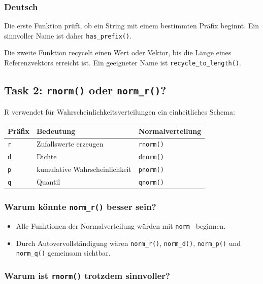 \documentclass[11pt,a4paper]{ctexart}
\begin{document}
\subsubsection*{Deutsch}

Die erste Funktion prüft, ob ein String mit einem bestimmten Präfix beginnt.
Ein sinnvoller Name ist daher \texttt{has\_prefix()}.

Die zweite Funktion recycelt einen Wert oder Vektor, bis die Länge eines
Referenzvektors erreicht ist. Ein geeigneter Name ist
\texttt{recycle\_to\_length()}.

\subsection{Task 2: \texttt{rnorm()} oder \texttt{norm\_r()}?}

R verwendet für Wahrscheinlichkeitsverteilungen ein einheitliches Schema:

\begin{center}
\begin{tabular}{lll}
\toprule
Präfix & Bedeutung & Normalverteilung \\
\midrule
\texttt{r} & Zufallswerte erzeugen & \texttt{rnorm()} \\
\texttt{d} & Dichte & \texttt{dnorm()} \\
\texttt{p} & kumulative Wahrscheinlichkeit & \texttt{pnorm()} \\
\texttt{q} & Quantil & \texttt{qnorm()} \\
\bottomrule
\end{tabular}
\end{center}

\subsubsection*{Warum könnte \texttt{norm\_r()} besser sein?}

\begin{itemize}
  \item Alle Funktionen der Normalverteilung würden mit \texttt{norm\_}
  beginnen.
  \item Durch Autovervollständigung wären
  \texttt{norm\_r()}, \texttt{norm\_d()}, \texttt{norm\_p()} und
  \texttt{norm\_q()} gemeinsam sichtbar.
\end{itemize}

\subsubsection*{Warum ist \texttt{rnorm()} trotzdem sinnvoller?}
\end{document}
